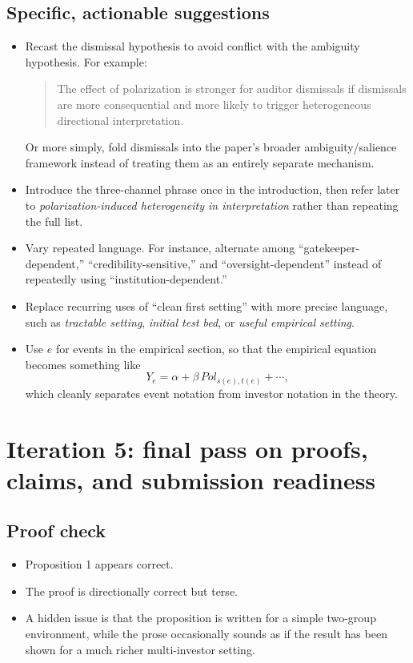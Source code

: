 \documentclass[12pt]{article}
\begin{document}
\subsection*{Specific, actionable suggestions}
\begin{itemize}[leftmargin=1.5em]
    \item Recast the dismissal hypothesis to avoid conflict with the ambiguity hypothesis. For example:
    \begin{quote}
    The effect of polarization is stronger for auditor dismissals if dismissals are more consequential and more likely to trigger heterogeneous directional interpretation.
    \end{quote}
    Or more simply, fold dismissals into the paper's broader ambiguity/salience framework instead of treating them as an entirely separate mechanism.
    \item Introduce the three-channel phrase once in the introduction, then refer later to \emph{polarization-induced heterogeneity in interpretation} rather than repeating the full list.
    \item Vary repeated language. For instance, alternate among ``gatekeeper-dependent,'' ``credibility-sensitive,'' and ``oversight-dependent'' instead of repeatedly using ``institution-dependent.''
    \item Replace recurring uses of ``clean first setting'' with more precise language, such as \emph{tractable setting}, \emph{initial test bed}, or \emph{useful empirical setting}.
    \item Use \(e\) for events in the empirical section, so that the empirical equation becomes something like
    \[
    Y_e = \alpha + \beta \, Pol_{s(e),t(e)} + \cdots,
    \]
    which cleanly separates event notation from investor notation in the theory.
\end{itemize}

\section*{Iteration 5: final pass on proofs, claims, and submission readiness}

\subsection*{Proof check}
\begin{itemize}[leftmargin=1.5em]
    \item Proposition 1 appears correct.
    \item The proof is directionally correct but terse.
    \item A hidden issue is that the proposition is written for a simple two-group environment, while the prose occasionally sounds as if the result has been shown for a much richer multi-investor setting.
\end{itemize}
\end{document}
